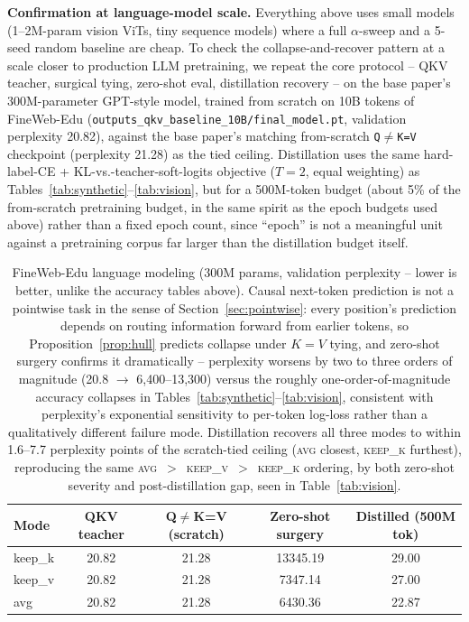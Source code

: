 \documentclass[11pt]{article}
\begin{document}
\textbf{Confirmation at language-model scale.} Everything above uses small models
(1--2M-param vision ViTs, tiny sequence models) where a full $\alpha$-sweep and a
5-seed random baseline are cheap. To check the collapse-and-recover pattern at a scale closer
to production LLM pretraining, we repeat the core protocol -- QKV teacher, surgical
tying, zero-shot eval, distillation recovery -- on the base paper's 300M-parameter
GPT-style model, trained from scratch on 10B tokens of FineWeb-Edu
(\texttt{outputs\_qkv\_baseline\_10B/final\_model.pt}, validation perplexity 20.82),
against the base paper's matching from-scratch \texttt{Q}$\neq$\texttt{K=V} checkpoint
(perplexity 21.28) as the tied ceiling. Distillation uses the same
hard-label-CE + KL-vs.-teacher-soft-logits objective ($T{=}2$, equal weighting) as
Tables~\ref{tab:synthetic}--\ref{tab:vision}, but for a 500M-token budget (about 5\% of
the from-scratch pretraining budget, in the same spirit as the epoch budgets used
above) rather than a fixed epoch count, since ``epoch'' is not a meaningful unit
against a pretraining corpus far larger than the distillation budget itself.

\begin{table}[h]
\centering
\small
\begin{tabular}{lcccc}
\toprule
Mode & QKV teacher & Q$\neq$K=V (scratch) & Zero-shot surgery & Distilled (500M tok) \\
\midrule
keep\_k & 20.82 & 21.28 & 13345.19 & 29.00 \\
keep\_v & 20.82 & 21.28 & 7347.14  & 27.00 \\
avg     & 20.82 & 21.28 & 6430.36  & 22.87 \\
\bottomrule
\end{tabular}
\caption{FineWeb-Edu language modeling (300M params, validation perplexity --
lower is better, unlike the accuracy tables above). Causal next-token prediction is
not a pointwise task in the sense of Section~\ref{sec:pointwise}: every position's
prediction depends on routing information forward from earlier tokens, so
Proposition~\ref{prop:hull} predicts collapse under $K=V$ tying, and zero-shot surgery
confirms it dramatically -- perplexity worsens by two to three orders of magnitude
(20.8 $\to$ 6{,}400--13{,}300) versus the roughly one-order-of-magnitude accuracy
collapses in Tables~\ref{tab:synthetic}--\ref{tab:vision}, consistent with
perplexity's exponential sensitivity to per-token log-loss rather than a qualitatively
different failure mode. Distillation recovers all three modes to within 1.6--7.7
perplexity points of the scratch-tied ceiling (\textsc{avg} closest, \textsc{keep\_k}
furthest), reproducing the same
\textsc{avg}~$>$~\textsc{keep\_v}~$>$~\textsc{keep\_k} ordering, by both zero-shot
severity and post-distillation gap, seen in Table~\ref{tab:vision}.}
\label{tab:llm}
\end{table}
\end{document}
